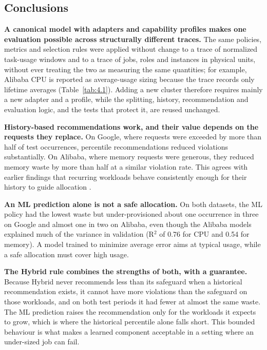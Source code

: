 \documentclass{IEEEtran}
\begin{document}
\subsection{Conclusions}\label{sec:9.2}

\textbf{A canonical model with adapters and capability profiles makes one evaluation possible across structurally different traces.} The same policies, metrics and selection rules were applied without change to a trace of normalized task-usage windows and to a trace of jobs, roles and instances in physical units, without ever treating the two as measuring the same quantities; for example, Alibaba CPU is reported as average-usage sizing because the trace records only lifetime averages (Table~\ref{tab:4.1}). Adding a new cluster therefore requires mainly a new adapter and a profile, while the splitting, history, recommendation and evaluation logic, and the tests that protect it, are reused unchanged.

\textbf{History-based recommendations work, and their value depends on the requests they replace.} On Google, where requests were exceeded by more than half of test occurrences, percentile recommendations reduced violations substantially. On Alibaba, where memory requests were generous, they reduced memory waste by more than half at a similar violation rate. This agrees with earlier findings that recurring workloads behave consistently enough for their history to guide allocation \cite{ref2}.

\textbf{An ML prediction alone is not a safe allocation.} On both datasets, the ML policy had the lowest waste but under-provisioned about one occurrence in three on Google and almost one in two on Alibaba, even though the Alibaba models explained much of the variance in validation (R$^{2}$ of 0.76 for CPU and 0.54 for memory). A model trained to minimize average error aims at typical usage, while a safe allocation must cover high usage.

\textbf{The Hybrid rule combines the strengths of both, with a guarantee.} Because Hybrid never recommends less than its safeguard when a historical recommendation exists, it cannot have more violations than the safeguard on those workloads, and on both test periods it had fewer at almost the same waste. The ML prediction raises the recommendation only for the workloads it expects to grow, which is where the historical percentile alone falls short. This bounded behaviour is what makes a learned component acceptable in a setting where an under-sized job can fail.
\end{document}
